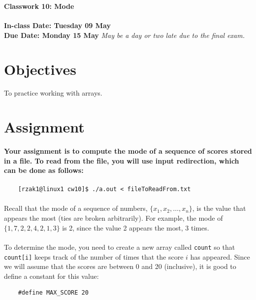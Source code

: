 \documentclass[letter,11pt]{article}
\begin{document}
\huge
\textbf{Classwork 10: Mode}
\normalsize
\\ ~~ \\
\textbf{In-class Date: Tuesday 09 May} \\
\textbf{Due Date: Monday 15 May} \textit{May be a day or two late due to the final exam.}

\section*{Objectives}
\paragraph{}To practice working with arrays.

\section*{Assignment}
\paragraph{Your assignment is to compute the mode of a sequence of scores stored in a file. To read from the file, you will use input redirection, which can be done as follows:}
\begin{verbatim}
    [rzak1@linux1 cw10]$ ./a.out < fileToReadFrom.txt
\end{verbatim}

\paragraph{}Recall that the mode of a sequence of numbers, $\{x_1, x_2, \ldots, x_n\}$, is the value that appears the most (ties are broken arbitrarily). For example, the mode of $\{1, 7, 2, 2, 4, 2, 1, 3\}$ is 2, since the value 2 appears the most, 3 times.

\paragraph{}To determine the mode, you need to create a new array called \texttt{count} so that \texttt{count[i]} keeps track of the number of times that the score $i$ has appeared. Since we will assume that the scores are between 0 and 20 (inclusive), it is good to define a constant for this value:
\begin{verbatim}
    #define MAX_SCORE 20
\end{verbatim}
\end{document}
